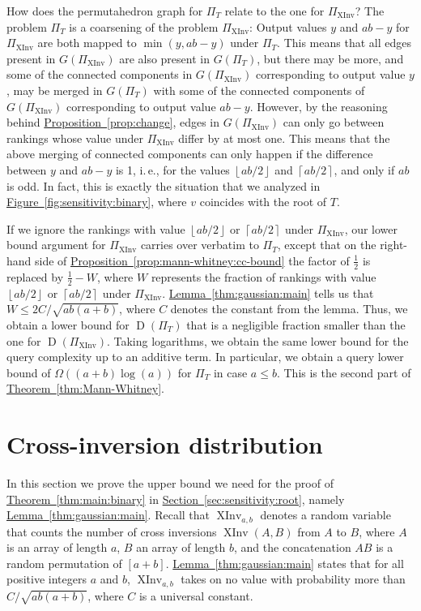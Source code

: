 \documentclass[11pt]{article}
\numberwithin{equation}{section}
\theoremstyle{definition}
\theoremstyle{plain}
\newcommand{\ie}{i.\,e.}
\newcommand{\expref}[2]{\hyperref[#2]{#1~\ref{#2}}}
\newcommand{\floor}[1]{\left\lfloor #1\right\rfloor}
\newcommand{\ceil}[1]{\left\lceil #1\right\rceil}
\newcommand{\XInvD}{\XInv}
\DeclareMathOperator{\XInv}{XInv}
\DeclareMathOperator{\traces}{D}
\begin{document}
How does the permutahedron graph for $\Pi_T$ relate to the one for $\Pi_{\XInv}$? The problem $\Pi_T$ is a coarsening of the problem $\Pi_{\XInv}$: Output values $y$ and $ab-y$ for $\Pi_{\XInv}$ are both mapped to $\min(y,ab-y)$ under $\Pi_T$. This means that all edges present in $G(\Pi_{\XInv})$ are also present in $G(\Pi_T)$, but there may be more, and some of the connected components in $G(\Pi_{\XInv})$ corresponding to output value $y$, may be merged in $G(\Pi_T)$ with some of the connected components of $G(\Pi_{\XInv})$ corresponding to output value $ab-y$. However, by the reasoning behind \expref{Proposition}{prop:change}, edges in $G(\Pi_{\XInv})$ can only go between rankings whose value under $\Pi_{\XInv}$ differ by at most one. This means that the above merging of connected components can only happen if the difference between $y$ and $ab-y$ is 1, \ie, for the values $\floor{ab/2}$ and $\ceil{ab/2}$, and only if $ab$ is odd. In fact, this is exactly the situation that we analyzed in \expref{Figure}{fig:sensitivity:binary}, where $v$ coincides with the root of $T$. 

If we ignore the rankings with value $\floor{ab/2}$ or $\ceil{ab/2}$ under $\Pi_{\XInv}$, our lower bound argument for $\Pi_{\XInv}$ carries over verbatim to $\Pi_T$, except that on the right-hand side of \expref{Proposition}{prop:mann-whitney:cc-bound} the factor of $\frac{1}{2}$ is replaced by $\frac{1}{2}-W$, where $W$ represents the fraction of rankings with value $\floor{ab/2}$ or $\ceil{ab/2}$ under $\Pi_{\XInv}$. \expref{Lemma}{thm:gaussian:main} tells us that $W \le 2C/\sqrt{ab(a+b)}$, where $C$ denotes the constant from the lemma. Thus, we obtain a lower bound for $\traces(\Pi_T)$ that is a negligible fraction smaller than the one for $\traces(\Pi_{\XInv})$. Taking logarithms, we obtain the same lower bound for the query complexity up to an additive term. In particular, we obtain a query lower bound of $\Omega((a+b)\log(a))$ for $\Pi_T$ in case $a \le b$. This is the second part of \expref{Theorem}{thm:Mann-Whitney}.



\section{Cross-inversion distribution}
\label{sec:cross-inversions}
%
%
%
%

%
%
%
%
%
%
%
%
%

In this section we prove the upper bound we need for the proof of \expref{Theorem}{thm:main:binary} in \expref{Section}{sec:sensitivity:root}, namely \expref{Lemma}{thm:gaussian:main}. Recall that $\XInvD_{a,b}$ denotes a random variable that counts the number of cross inversions $\XInv(A,B)$ from $A$ to $B$, where $A$ is an array of length $a$, $B$ an array of length $b$, and the concatenation $AB$ is a random permutation of $[a+b]$.
\expref{Lemma}{thm:gaussian:main} states that for all positive integers $a$ and $b$, $\XInvD_{a,b}$ takes on no value with probability more than $C/\sqrt{ab(a+b)}$, where $C$ is a universal constant.
\end{document}
